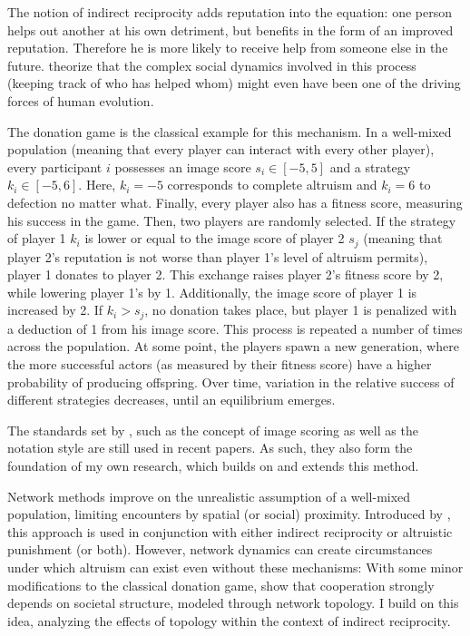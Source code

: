 \documentclass[12pt]{article}
\begin{document}
The notion of indirect reciprocity adds reputation into the equation: one person helps out another at his own detriment, but benefits in the form of an improved reputation. Therefore he is more likely to receive help from someone else in the future. \cite{Nowak1998} theorize that the complex social dynamics involved in this process (keeping track of who has helped whom) might even have been one of the driving forces of human evolution.

The donation game is the classical example for this mechanism. In a well-mixed population (meaning that every player can interact with every other player), every participant $i$ possesses an image score $s_i \in [-5,5]$ and a strategy $k_i \in [-5,6]$. Here, $k_i=-5$ corresponds to complete altruism and $k_i=6$ to defection no matter what. Finally, every player also has a fitness score, measuring his success in the game. Then, two players are randomly selected. If the strategy of player 1 $k_i$ is lower or equal to the image score of player 2 $s_j$ (meaning that player 2's reputation is not worse than player 1's level of altruism permits), player 1 donates to player 2. This exchange raises player 2's fitness score by 2, while lowering player 1's by 1. Additionally, the image score of player 1 is increased by 2. If $k_i>s_j$, no donation takes place, but player 1 is penalized with a deduction of 1 from his image score. This process is repeated a number of times across the population. At some point, the players spawn a new generation, where the more successful actors (as measured by their fitness score) have a higher probability of producing offspring. Over time, variation in the relative success of different strategies decreases, until an equilibrium emerges.

The standards set by \cite{Nowak1998}, such as the concept of image scoring as well as the notation style are still used in recent papers. As such, they also form the foundation of my own research, which builds on and extends this method.

Network methods improve on the unrealistic assumption of a well-mixed population, limiting encounters by spatial (or social) proximity. Introduced by \cite{Kearns2001}, this approach is used in conjunction with either indirect reciprocity or altruistic punishment (or both). However, network dynamics can create circumstances under which altruism can exist even without these mechanisms: With some minor modifications to the classical donation game, \citep{Santos2008} show that cooperation strongly depends on societal structure, modeled through network topology. I build on this idea, analyzing the effects of topology within the context of indirect reciprocity.
\end{document}
